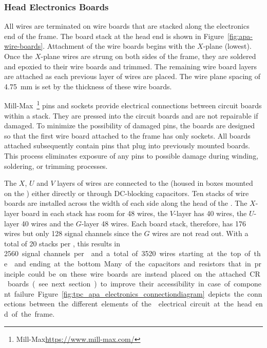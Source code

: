 \subsubsection{Head Electronics Boards}

All  wires are terminated on wire boards that are stacked along the electronics end of the  frame.  The board stack at the head end is shown in Figure~\ref{fig:apa-wire-boards}. Attachment of the wire boards begins with the $X$-plane (lowest). Once the $X$-plane wires are strung on both sides of the  frame, they are soldered and epoxied to their wire boards and trimmed. The remaining wire board layers are attached as each previous layer of wires are placed.  The wire plane spacing of \SI{4.75}{mm} is set by the thickness of these wire boards.   

Mill-Max~\footnote{Mill-Max\texttrademark \url{https://www.mill-max.com/}} pins and sockets provide electrical connections between circuit boards within a stack. They are pressed into the circuit boards and are not repairable if damaged. To minimize the possibility of damaged pins, the boards are designed so that the first wire board attached to the frame has only sockets. All boards attached subsequently contain pins that plug into previously mounted boards. This process eliminates exposure of any pins to possible damage during winding, soldering, or trimming processes.

The $X$, $U$ and $V$ layers of wires are connected to the  (housed in boxes mounted on the ) either directly or through DC-blocking capacitors.  Ten stacks of wire boards are installed across the width of each side along the head of the .  The $X$-layer board in each stack has room for \num{48} wires, the $V$-layer has 40 wires, the $U$-layer \num{40} wires and the $G$-layer \num{48} wires.  Each board stack, therefore, has 176 wires but only \num{128} signal channels since the $G$ wires are not read out. With a total of \num{20} stacks per , this results in \SI{2560} signal channels per  and a total of \SI{3520} wires starting at the top of the  and ending at the bottom. Many of the capacitors and resistors that in principle could be on these wire boards are instead placed on the attached CR boards (see next section) to improve their accessibility in case of component failure. Figure~\ref{fig:tpc_apa_electronics_connectiondiagram} depicts the connections between the different elements of the  electrical circuit at the head end of the frame. 

